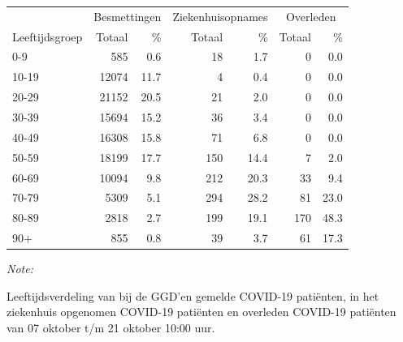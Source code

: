 \documentclass[
  english,
  man,floatsintext]{apa6}
\begin{document}
\begin{table}[H]
\centering\begingroup\fontsize{11}{13}\selectfont

\begin{threeparttable}
\begin{tabular}{lrrrrrr}
\toprule
\multicolumn{1}{c}{ } & \multicolumn{2}{c}{Besmettingen} & \multicolumn{2}{c}{Ziekenhuisopnames} & \multicolumn{2}{c}{Overleden} \\
\cmidrule(l{3pt}r{3pt}){2-3} \cmidrule(l{3pt}r{3pt}){4-5} \cmidrule(l{3pt}r{3pt}){6-7}
Leeftijdsgroep & Totaal & \% & Totaal & \% & Totaal & \%\\
\midrule
0-9 & 585 & 0.6 & 18 & 1.7 & 0 & 0.0\\
10-19 & 12074 & 11.7 & 4 & 0.4 & 0 & 0.0\\
20-29 & 21152 & 20.5 & 21 & 2.0 & 0 & 0.0\\
30-39 & 15694 & 15.2 & 36 & 3.4 & 0 & 0.0\\
40-49 & 16308 & 15.8 & 71 & 6.8 & 0 & 0.0\\
50-59 & 18199 & 17.7 & 150 & 14.4 & 7 & 2.0\\
60-69 & 10094 & 9.8 & 212 & 20.3 & 33 & 9.4\\
70-79 & 5309 & 5.1 & 294 & 28.2 & 81 & 23.0\\
80-89 & 2818 & 2.7 & 199 & 19.1 & 170 & 48.3\\
90+ & 855 & 0.8 & 39 & 3.7 & 61 & 17.3\\
\bottomrule
\end{tabular}
\begin{tablenotes}
\item \textit{Note: } 
\item Leeftijdsverdeling van bij de GGD’en gemelde COVID-19 patiënten, in het ziekenhuis opgenomen COVID-19 patiënten en overleden COVID-19 patiënten van 07 oktober t/m 21 oktober 10:00 uur.
\end{tablenotes}
\end{threeparttable}
\endgroup{}
\end{table}
\end{document}
